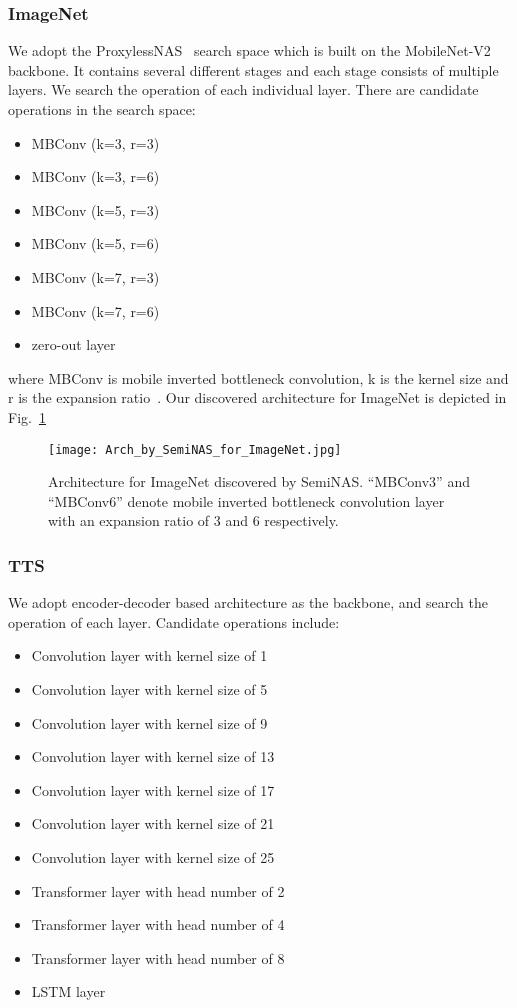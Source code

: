 \documentclass{article}
\begin{document}
\subsubsection{ImageNet}
We adopt the ProxylessNAS~\cite{proxylessnas} search space which is built on the MobileNet-V2~\cite{mobilenetv2} backbone. It contains several different stages and each stage consists of multiple layers. We search the operation of each individual layer. There are  candidate operations in the search space:
\begin{itemize}
    \item MBConv (k=3, r=3)
    \item MBConv (k=3, r=6)
    \item MBConv (k=5, r=3)
    \item MBConv (k=5, r=6)
    \item MBConv (k=7, r=3)
    \item MBConv (k=7, r=6)
    \item zero-out layer
\end{itemize}
where MBConv is mobile inverted bottleneck convolution, k is the kernel size and r is the expansion ratio~\cite{mobilenetv2}. Our discovered architecture for ImageNet is depicted in Fig.~\ref{fig:img}


\begin{figure}[htbp]
    \centering
    \texttt{[image: Arch\_by\_SemiNAS\_for\_ImageNet.jpg]}
    \caption{Architecture for ImageNet discovered by SemiNAS. “MBConv3” and “MBConv6” denote mobile inverted bottleneck convolution layer with an expansion ratio of 3 and 6 respectively.}
    \label{fig:img}
\end{figure}

\subsubsection{TTS}
We adopt encoder-decoder based architecture as the backbone, and search the operation of each layer. Candidate operations include:
\begin{itemize}
    \item Convolution layer with kernel size of 1
    \item Convolution layer with kernel size of 5
    \item Convolution layer with kernel size of 9
    \item Convolution layer with kernel size of 13
    \item Convolution layer with kernel size of 17
    \item Convolution layer with kernel size of 21
    \item Convolution layer with kernel size of 25
    \item Transformer layer with head number of 2
    \item Transformer layer with head number of 4
    \item Transformer layer with head number of 8
    \item LSTM layer
\end{itemize}
\end{document}

